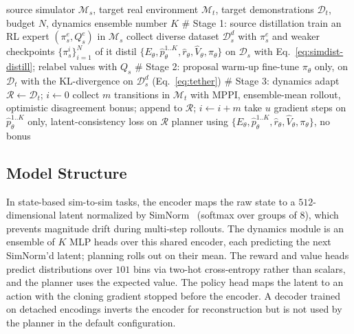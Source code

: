 \documentclass{article} %
\begin{document}
\begin{algorithm}[h]
\caption{SimADEPT}
\label{alg:simoaed}
\begin{algorithmic}[1]
\Require source simulator $\mathcal{M}_s$, target real environment $\mathcal{M}_t$,
         target demonstrations $\mathcal{D}_t$, budget $N$,
         dynamics ensemble number $K$
\Statex $\#$ Stage 1: source distillation
\State train an RL expert $(\pi_s^e, Q_s^e)$ in $\mathcal{M}_s$
\State collect diverse dataset $\mathcal{D}_s^d$ with $\pi_s^e$ and weaker checkpoints $\{\pi_s^i\}_{i=1}^N$ of it
\State distil $\{E_\theta, \hat p_\theta^{1..K}, \hat r_\theta, \hat V_\theta, \pi_\theta\}$
       on $\mathcal{D}_s$ with Eq.~\ref{eq:simdist-distill}; relabel values with $Q_s$
\Statex $\#$ Stage 2: proposal warm-up
\State fine-tune $\pi_\theta$ only, on $\mathcal{D}_t$ with the KL-divergence on $\mathcal{D}_s^d$ (Eq.~\ref{eq:tether})
\Statex $\#$ Stage 3: dynamics adapt
\State $\mathcal{R} \gets \mathcal{D}_t$; \; $i \gets 0$
  \State collect $m$ transitions in $\mathcal{M}_t$ with MPPI, ensemble-mean rollout,
         optimistic disagreement bonus; append to $\mathcal{R}$; \; $i \gets i + m$
  \State take $u$ gradient steps on $\hat p_\theta^{1..K}$ only, latent-consistency
         loss on $\mathcal{R}$ 
\EndWhile
\State \Return planner using $\{E_\theta, \hat p_\theta^{1..K}, \hat r_\theta, \hat V_\theta, \pi_\theta\}$, no bonus
\end{algorithmic}
\end{algorithm}

\subsection{Model Structure}

In state-based sim-to-sim tasks, the encoder maps the raw state to a $512$-dimensional latent normalized by SimNorm~\citep{hansen2024td} (softmax over groups of $8$), which prevents magnitude drift during multi-step rollouts. The dynamics module is an ensemble of $K$ MLP heads over this shared encoder, each predicting the next SimNorm'd latent; planning rolls out on their mean. The reward and value heads predict distributions over $101$ bins via two-hot cross-entropy rather than scalars, and the planner uses the expected value. The policy head maps the latent to an action with the cloning gradient stopped before the encoder. A decoder trained on detached encodings inverts the encoder for reconstruction but is not used by the planner in the default configuration.
\end{document}
